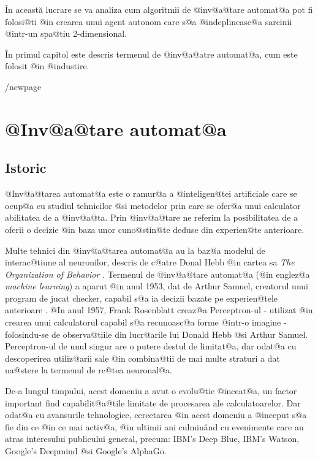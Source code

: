 \^ In aceast\u a lucrare se va analiza cum algoritmii de @inv@a@tare automat@a  pot fi folosi@ti @in crearea unui agent autonom care s@a @indeplineasc@a sarcinii @intr-un spa@tiu 2-dimensional.
\hspace{0.2cm}

\^ In primul capitol este descris termenul de @inv@a@atre automat@a, cum este folosit @in @industire. 

/newpage

\chapter{ @Inv@a@tare automat@a }

\section{Istoric}

	@Inv@a@tarea automat@a este o ramur@a a @inteligen@tei artificiale care se ocup@a cu studiul tehnicilor @si metodelor prin care se ofer@a unui calculator abilitatea de a @inv@a@ta. Prin @inv@a@tare ne referim la posibilitatea de a oferii o decizie @in baza unor cuno@stin@te deduse din experien@te anterioare.

 Multe tehnici din @inv@a@tarea automat@a au la baz@a modelul de interac@tiune al neuronilor, descris de c@atre Donal Hebb @in cartea sa {\sl The Organization of Behavior} \cite{donald-hebb-book}. Termenul de @inv@a@tare automat@a (@in englez@a {\sl machine learning}) a aparut @in anul 1953, dat de Arthur Samuel, creatorul unui program de jucat checker, capabil s@a ia decizii bazate pe experien@tele anterioare \cite{arthur-samuel}. @In anul 1957, Frank Rosenblatt creaz@a Perceptron-ul - utilizat @in crearea unui calculatorul capabil s@a recunoasc@a forme @intr-o imagine - folosindu-se de observa@tiile din lucr@arile lui Donald Hebb @si Arthur Samuel. Perceptron-ul de unul singur are o putere destul de limitat@a, dar odat@a cu descoperirea utiliz@arii sale @in combina@tii de mai multe straturi a dat na@stere la termenul de re@tea neuronal@a. 
 
 De-a lungul timpului, acest domeniu a avut o evolu@tie @inceat@a, un factor important find capabilit@a@tile limitate de procesarea ale calculatoarelor. Dar odat@a cu avansurile tehnologice, cercetarea @in acest domeniu a @inceput s@a fie din ce @in ce mai activ@a, @in ultimii ani culmin\^ and cu evenimente care au atras interesului publicului general, precum: IBM's Deep Blue, IBM's Watson, Google's Deepmind @si Google's AlphaGo.
 
